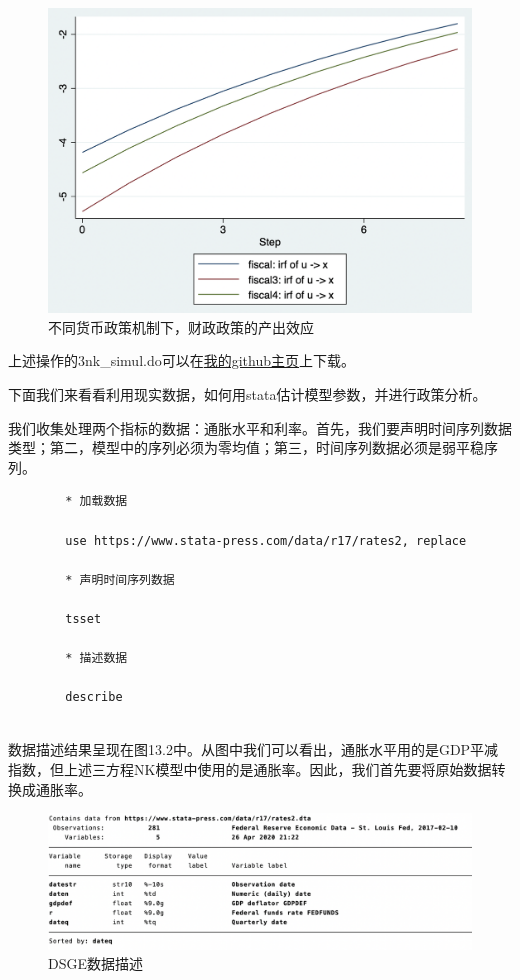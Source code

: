 \documentclass[cn,12pt,math=newtx,citestyle=gb7714-2015,bibstyle=gb7714-2015]{elegantbook}
\begin{document}
\begin{figure}[tbph]
	\centering
	\includegraphics[width=1\linewidth]{fiscal4}
	\caption{不同货币政策机制下，财政政策的产出效应}
	\label{fig:fiscal4}
\end{figure}
	
	上述操作的3nk\_simul.do可以在\href{https://github.com/wenddymacro/Wenddy-XU}{我的github主页}上下载。
	
	下面我们来看看利用现实数据，如何用stata估计模型参数，并进行政策分析。
	
	我们收集处理两个指标的数据：通胀水平和利率。首先，我们要声明时间序列数据类型；第二，模型中的序列必须为零均值；第三，时间序列数据必须是弱平稳序列。
	
	\begin{lstlisting}
		* 加载数据
		
		use https://www.stata-press.com/data/r17/rates2, replace
		
		* 声明时间序列数据
		
		tsset
		
		* 描述数据
		
		describe
		
	\end{lstlisting}
	
	数据描述结果呈现在图13.2中。从图中我们可以看出，通胀水平用的是GDP平减指数，但上述三方程NK模型中使用的是通胀率。因此，我们首先要将原始数据转换成通胀率。
	
	
	\begin{figure}[tbph]
		\centering
		\includegraphics[width=1\linewidth]{dsge_data}
		\caption{DSGE数据描述}
		\label{fig:dsgedata}
	\end{figure}
	
\end{document}
